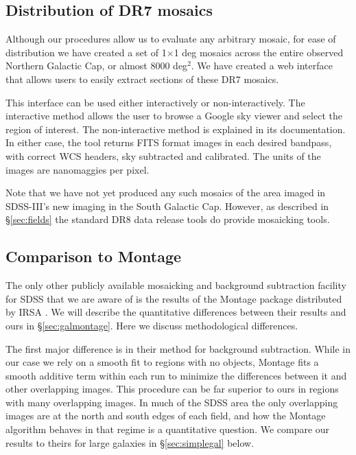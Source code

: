 \documentclass[10pt,preprint]{aastex}
\begin{document}
\subsection{Distribution of DR7 mosaics}
\label{sec:distmosaic}

Although our procedures allow us to evaluate any arbitrary mosaic, for
ease of distribution we have created a set of 1$\times$1 deg mosaics
across the entire observed Northern Galactic Cap, or almost 8000
deg$^2$. We have created a web interface that allows users to easily
extract sections of these DR7 mosaics.

This interface can be used either interactively or
non-interactively. The interactive method allows the user to browse a
Google sky viewer and select the region of interest.  The
non-interactive method is explained in its documentation.  In either
case, the tool returns FITS format images in each desired bandpass,
with correct WCS headers, sky subtracted and calibrated. The units of
the images are nanomaggies per pixel.

Note that we have not yet produced any such mosaics of the area imaged
in SDSS-III's new imaging in the South Galactic Cap. However, as
described in \S\ref{sec:fields} the standard DR8 data release tools do
provide mosaicking tools.

\subsection{Comparison to Montage}

The only other publicly available mosaicking and background
subtraction facility for SDSS that we are aware of is the results of
the Montage package distributed by IRSA
\citep{berriman03a,berriman04a}. We will describe the quantitative
differences between their results and ours in \S\ref{sec:galmontage}.
Here we discuss methodological differences.

The first major difference is in their method for background
subtraction. While in our case we rely on a smooth fit to regions with
no objects, Montage fits a smooth additive term within each run to
minimize the differences between it and other overlapping images.
This procedure can be far superior to ours in regions with many
overlapping images.  In much of the SDSS area the only overlapping
images are at the north and south edges of each field, and how the
Montage algorithm behaves in that regime is a quantitative
question. We compare our results to theirs for large galaxies in
\S\ref{sec:simplegal} below.
\end{document}
